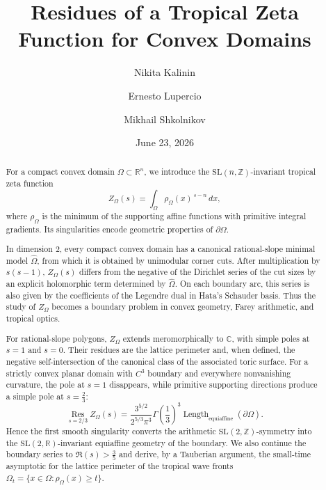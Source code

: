 \documentclass[a4paper,american,11pt]{amsart}
\theoremstyle{plain}
\theoremstyle{definition}
\begin{document}
\title[Residues of a tropical zeta function]
{Residues of a Tropical Zeta Function for Convex Domains}

\author{Nikita Kalinin \and Ernesto Lupercio \and Mikhail Shkolnikov}

\date{June 23, 2026}


\begin{abstract}
For a compact convex domain \(\Omega\subset\mathbb{R}^n\), we introduce the
\(\mathrm{SL}(n,\mathbb{Z})\)-invariant tropical zeta function
\[
Z_\Omega(s)=\int_\Omega \rho_\Omega(x)^{\,s-n}\,dx,
\]
where \(\rho_\Omega\) is the minimum of the supporting affine functions with
primitive integral gradients. Its singularities encode geometric properties
of \(\partial\Omega\).

In dimension \(2\), every compact convex domain has a canonical
rational-slope minimal model \(\widehat\Omega\), from which it is obtained
by unimodular corner cuts. After multiplication by \(s(s-1)\),
\(Z_\Omega(s)\) differs from the negative of the Dirichlet series of the
cut sizes by an explicit holomorphic term determined by
\(\widehat\Omega\). On each boundary arc, this series is also given by the
coefficients of the Legendre dual in Hata's Schauder basis. Thus the study
of \(Z_\Omega\) becomes a boundary problem in convex geometry, Farey
arithmetic, and tropical optics.

For rational-slope polygons, \(Z_\Omega\) extends meromorphically to
\(\mathbb{C}\), with simple poles at \(s=1\) and \(s=0\). Their residues
are the lattice perimeter and, when defined, the negative self-intersection
of the canonical class of the associated toric surface. For a strictly
convex planar domain with \(C^3\) boundary and everywhere nonvanishing
curvature, the pole at \(s=1\) disappears, while primitive supporting
directions produce a simple pole at \(s=\frac23\):
\[
\operatorname*{Res}_{s=2/3}Z_\Omega(s)
=
\frac{3^{5/2}}{2^{5/3}\pi^3}
\Gamma\!\left(\frac13\right)^3
\operatorname{Length}_{\mathrm{equiaffine}}(\partial\Omega).
\]
Hence the first smooth singularity converts the arithmetic
\(\mathrm{SL}(2,\mathbb{Z})\)-symmetry into the
\(\mathrm{SL}(2,\mathbb{R})\)-invariant equiaffine geometry of the
boundary. We also continue the boundary series to
\(\Re(s)>\frac35\) and derive, by a Tauberian argument, the small-time
asymptotic for the lattice perimeter of the tropical wave fronts
\(\Omega_t=\{x\in\Omega:\rho_\Omega(x)\geq t\}\).


\end{abstract}
\end{document}
